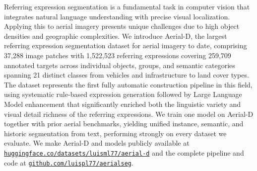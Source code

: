 \acresetall
\noindent Referring expression segmentation is a fundamental task in computer vision that integrates natural language understanding with precise visual localization. Applying this to aerial imagery presents unique challenges due to high object densities and geographic complexities. We introduce Aerial-D, the largest referring expression segmentation dataset for aerial imagery to date, comprising 37,288 image patches with 1,522,523 referring expressions covering 259,709 annotated targets across individual objects, groups, and semantic categories spanning 21 distinct classes from vehicles and infrastructure to land cover types. The dataset represents the first fully automatic construction pipeline in this field, using systematic rule-based expression generation followed by Large Language Model enhancement that significantly enriched both the linguistic variety and visual detail richness of the referring expressions. We train one model on Aerial-D together with prior aerial benchmarks, yielding unified instance, semantic, and historic segmentation from text, performing strongly on every dataset we evaluate. We make Aerial-D and models publicly available at \href{https://huggingface.co/datasets/luisml77/aerial-d}{\texttt{huggingface.co/datasets/luisml77/aerial-d}} and the complete pipeline and code at \href{https://github.com/luispl77/aerialseg}{\texttt{github.com/luispl77/aerialseg}}.